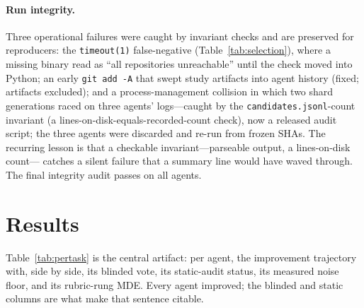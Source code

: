 \documentclass[11pt]{article}
\begin{document}
\paragraph{Run integrity.}
Three operational failures were caught by invariant checks and are preserved
for reproducers: the \texttt{timeout(1)} false-negative
(Table~\ref{tab:selection}), where a missing binary read as ``all repositories
unreachable'' until the check moved into Python; an early \texttt{git add -A}
that swept study artifacts into agent history (fixed; artifacts excluded); and
a process-management collision in which two shard generations raced on three
agents' logs---caught by the \texttt{candidates.jsonl}-count invariant (a
lines-on-disk-equals-recorded-count check), now a released audit script; the
three agents were discarded and re-run from frozen SHAs. The recurring lesson
is that a checkable invariant---parseable output, a lines-on-disk count---
catches a silent failure that a summary line would have waved through. The
final integrity audit passes on all \swN{} agents.

\section{Results}
\label{sec:results}
Table~\ref{tab:pertask} is the central artifact: per agent, the improvement
trajectory with, side by side, its blinded vote, its static-audit status, its
measured noise floor, and its rubric-rung MDE. Every agent improved; the
blinded and static columns are what make that sentence citable.

\begin{table}\centering
\caption{Per-agent results with ladder columns (full-page landscape for
legibility). Struct and Final are the \emph{deployed} (best-applied, committed)
states; $\Delta$ = deployed final $-$ baseline (\textsc{rubric}, judge scale).
Final$^{\ast}$ is the best-\emph{proposed} search ceiling (not necessarily
committed), shown for contrast. Blind = blinded A/B votes for the patched
state, $k{=}\swBlindK$ (\textsc{blinded}; post-repair; ``--'' = no applied patch
to compare). AST \checkmark{} = all changed files parse (\textsc{static},
post-repair). Floor = measured paraphrase noise floor; MDE$^{a}_{80}$ = minimum
detectable effect at the probe count under the gate's \emph{assumed} noise
constant (the measured-noise MDE is in \S\ref{sec:power}).}
\label{tab:pertask}
\footnotesize
\setlength{\tabcolsep}{5pt}

\end{table}
\end{document}
